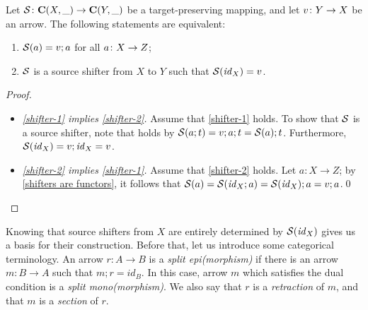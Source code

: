 %
\begin{lemma}
Let $\mathcal{S} \colon \mathbf{C}(X,\_) \rightarrow \mathbf{C}(Y, \_)$  be a target-preserving mapping, and let $v\colon Y\rightarrow X$ be an arrow. The following statements are equivalent:
\begin{enumerate}[topsep=\smallskipamount,label=(\alph*),ref=(\alph{enumi})]
\item\label{shifter-1} $\mathcal{S}(a)=v;a$ for all $a\colon X\rightarrow Z$;
\item\label{shifter-2} $\mathcal{S}$ is a source shifter from $X$ to $Y$ such that $\mathcal{S}(\mathit{id}_X)=v$.
\end{enumerate}
\end{lemma}
%
\begin{fullorname}
\begin{proof}
\begin{itemize}[topsep=\smallskipamount]
\item \emph{\ref{shifter-1} implies \ref{shifter-2}.}
%
Assume that \ref{shifter-1} holds. To show that  $\mathcal{S}$ is a source shifter, note that   holds by $\mathcal{S}(a;t)=v;a;t=\mathcal{S}(a);t$. Furthermore, $\mathcal{S}(\mathit{id}_X)=v;\mathit{id}_X=v$.

\item \emph{\ref{shifter-2} implies \ref{shifter-1}.}
%
Assume that \ref{shifter-2} holds. Let $a:X\to Z$; by \eqref{shifters are functors}, it follows that $\mathcal{S}(a)=\mathcal{S}(\mathit{id}_X;a)=\mathcal{S}(\mathit{id}_X);a=v;a$.\qed
\end{itemize}
\end{proof}
\end{fullorname}
%
Knowing that source shifters from $X$ are entirely determined by $\mathcal{S}(\mathit{id}_X)$ gives us a basis for their construction. Before that, let us introduce some categorical terminology. An arrow $r: A \to B$ is a \emph{split epi(morphism)} if there is an arrow $m:B\to A$ such that $m;r = id_B$. In this case, arrow $m$ which satisfies the dual condition is a 
\emph{split mono(morphism)}. We also say that $r$ is a \emph{retraction} of $m$, and that $m$ is a \emph{section} of $r$.

